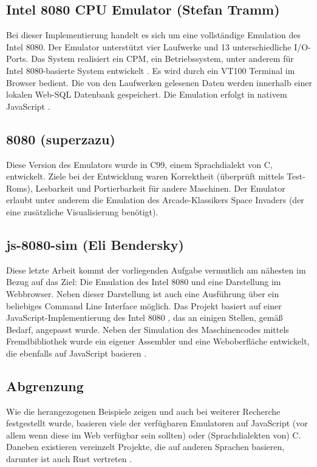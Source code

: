 \subsection{Intel 8080 CPU Emulator (Stefan Tramm)}

Bei dieser Implementierung handelt es sich um eine vollständige Emulation des Intel 8080. Der Emulator unterstützt vier Laufwerke und 13 unterschiedliche I/O-Ports. Das System realisiert ein \ac{CPM}, ein Betriebssystem, unter anderem für Intel 8080-basierte System entwickelt \cite{cpm}. Es wird durch ein VT100 Terminal im Browser bedient. Die von den Laufwerken gelesenen Daten werden innerhalb einer lokalen Web-SQL Datenbank gespeichert. Die Emulation erfolgt in nativem JavaScript \cite{intelTramm}.

\subsection{8080 (superzazu)}

Diese Version des Emulators wurde in C99, einem Sprachdialekt von C, entwickelt. Ziele bei der Entwicklung waren Korrektheit (überprüft mittels Test-Roms), Lesbarkeit und Portierbarkeit für andere Maschinen. Der Emulator erlaubt unter anderem die Emulation des Arcade-Klassikers \glqq Space Invaders\grqq{} (der eine zusätzliche Visualisierung benötigt)\cite{intelSuper, spaceSuper}.

\subsection{js-8080-sim (Eli Bendersky)}

Diese letzte Arbeit kommt der vorliegenden Aufgabe vermutlich am nähesten im Bezug auf das Ziel: Die Emulation des Intel 8080 und eine Darstellung im Webbrowser. Neben dieser Darstellung ist auch eine Ausführung über ein beliebiges Command Line Interface möglich. Das Projekt basiert auf einer JavaScript-Implementierung des Intel 8080 \cite{8080js}, das an einigen Stellen, gemäß Bedarf, angepasst wurde. Neben der Simulation des Maschinencodes mittels Fremdbibliothek wurde ein eigener Assembler und eine Weboberfläche entwickelt, die ebenfalls auf JavaScript basieren \cite{intelEli}.

\subsection{Abgrenzung}

Wie die herangezogenen Beispiele zeigen und auch bei weiterer Recherche festgestellt wurde, basieren viele der verfügbaren Emulatoren auf JavaScript (vor allem wenn diese im Web verfügbar sein sollten) oder (Sprachdialekten von) C. Daneben existieren vereinzelt Projekte, die auf anderen Sprachen basieren, darunter ist auch Rust vertreten \cite{intelRust}.


